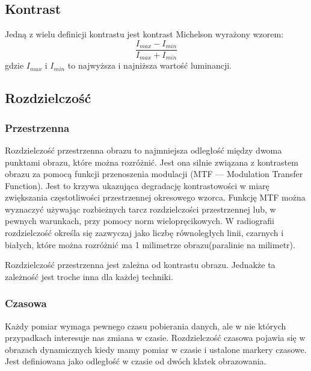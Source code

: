 


\subsection{Kontrast}

Jedną z wielu definicji kontrastu jest kontrast Michelson wyrażony wzorem:
\[\frac{I_{max}-I_{min}}{I_{max}+I_{min}}\]
gdzie $I_{max}$ i $I_{min}$ to najwyższa i najniższa wartość luminancji.

\subsection{Rozdzielczość}

\subsubsection*{Przestrzenna}

\par
Rozdzielczość przestrzenna obrazu to najmniejsza odległość między dwoma punktami obrazu, które można rozróżnić.
Jest ona silnie związana z kontrastem obrazu za pomocą funkcji przenoszenia modulacji (MTF –-- Modulation Transfer Function).
Jest to krzywa ukazująca degradację kontrastowości w miarę zwiększania częstotliwości przestrzennej okresowego wzorca.
Funkcję MTF można wyznaczyć używając rozbieżnych tarcz rozdzielczości przestrzennej lub, w pewnych warunkach, przy pomocy norm wielopręcikowych.
W radiografii rozdzielczość określa się zazwyczaj jako liczbę równoległych linii, czarnych i białych, które można rozróżnić ma 1 milimetrze obrazu(paralinie na milimetr).

\par
Rozdzielczość przestrzenna jest zależna od kontrastu obrazu.
Jednakże ta zależność jest troche inna dla każdej techniki.

\subsubsection*{Czasowa}

Każdy pomiar wymaga pewnego czasu pobierania danych, ale w nie których przypadkach interesuje nas zmiana w czasie.
Rozdzielczość czasowa pojawia się w obrazach dynamicznych kiedy mamy pomiar w czasie i ustalone markery czasowe.
Jest definiowana jako odległość w czasie od dwóch klatek obrazowania.

